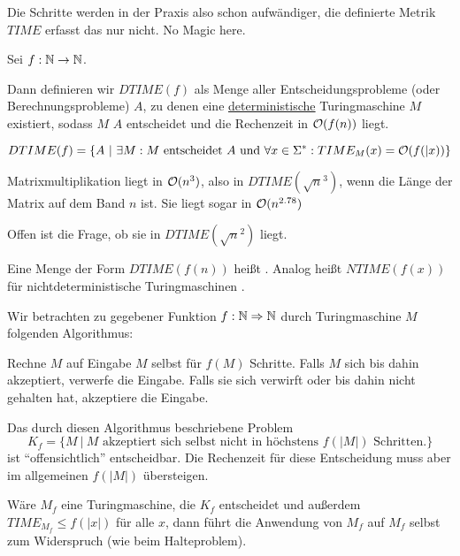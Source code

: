 Die Schritte werden in der Praxis also schon aufwändiger, die definierte Metrik $TIME$ erfasst das nur nicht. No Magic here.



\begin{definition}
    Sei $f: \mathbb{N} \rightarrow \mathbb{N}$. 

    Dann definieren wir $DTIME(f)$ als Menge aller Entscheidungsprobleme (oder Berechnungsprobleme) $A$, zu denen eine \underline{deterministische} Turingmaschine $M$ existiert, sodass $M$ $A$ entscheidet und die Rechenzeit in $\mathcal{O}(f(n))$ liegt.

    $$ DTIME(f) = \{  
        A 
        \ |\ 
        \exists M: 
            M \text{ entscheidet } A
            \text{ und }
            \forall x \in \Sigma^\ast: TIME_M(x) = \bigO(f(|x))
    \}
    $$
\end{definition}

\begin{satz}
    Matrixmultiplikation liegt in $\mathcal{O}(n^3)$, also in $DTIME(\sqrt{n}^3)$, wenn die Länge der Matrix auf dem Band $n$ ist.
    Sie liegt sogar in $\mathcal{O}(n^{2.78})$
\end{satz}

Offen ist die Frage, ob sie in $DTIME(\sqrt{n}^2)$ liegt.



\begin{definition}
    Eine Menge der Form $DTIME(f(n))$ heißt .
    Analog heißt $NTIME(f(x))$ für nichtdeterministische Turingmaschinen .
\end{definition}


Wir betrachten zu gegebener Funktion $f: \mathbb{N} \Rightarrow \mathbb{N}$ durch Turingmaschine $M$ folgenden Algorithmus:

Rechne $M$ auf Eingabe $M$ selbst für $f(M)$ Schritte. Falls $M$ sich bis dahin akzeptiert, verwerfe die Eingabe. Falls sie sich verwirft oder bis dahin nicht gehalten hat, akzeptiere die Eingabe.

Das durch diesen Algorithmus beschriebene Problem 
$$K_f = \{ M \ |\ M \text{ akzeptiert sich selbst nicht in höchstens } f(|M|) \text{ Schritten.} \}$$ 
ist ``offensichtlich'' entscheidbar. Die Rechenzeit für diese Entscheidung muss aber im allgemeinen $f(|M|)$ übersteigen.
    
Wäre $M_f$ eine Turingmaschine, die $K_f$ entscheidet und außerdem $TIME_{M_f} \leq f(|x|)$ für alle $x$, dann führt die Anwendung von $M_f$ auf $M_f$ selbst zum Widerspruch (wie beim Halteproblem).

